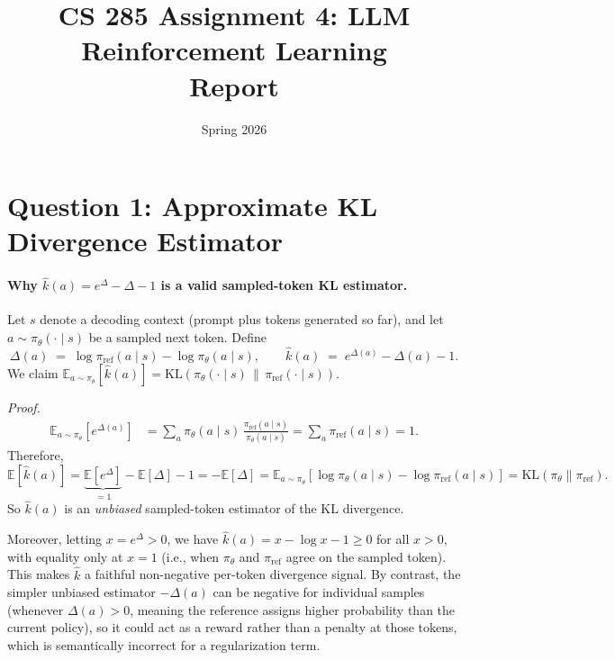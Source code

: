 \documentclass[11pt]{article}
\title{\textbf{CS 285 Assignment 4: LLM Reinforcement Learning}\\[0.4em]
       \large Report}
\author{}
\date{Spring 2026}
\begin{document}
\maketitle

\section*{Question 1: Approximate KL Divergence Estimator}

\paragraph{Why $\hat{k}(a) = e^{\Delta} - \Delta - 1$ is a valid sampled-token KL estimator.}

Let $s$ denote a decoding context (prompt plus tokens generated so far), and let
$a \sim \pi_\theta(\cdot \mid s)$ be a sampled next token. Define
\[
  \Delta(a) \;=\; \log \pi_{\mathrm{ref}}(a \mid s) - \log \pi_\theta(a \mid s),
  \qquad
  \hat{k}(a) \;=\; e^{\Delta(a)} - \Delta(a) - 1.
\]
We claim $\mathbb{E}_{a \sim \pi_\theta}[\hat{k}(a)]
= \mathrm{KL}\!\left(\pi_\theta(\cdot\mid s) \,\|\, \pi_{\mathrm{ref}}(\cdot\mid s)\right)$.

\textit{Proof.}
\begin{align*}
  \mathbb{E}_{a\sim\pi_\theta}\!\left[e^{\Delta(a)}\right]
    &= \sum_a \pi_\theta(a\mid s)\,\frac{\pi_{\mathrm{ref}}(a\mid s)}{\pi_\theta(a\mid s)}
     = \sum_a \pi_{\mathrm{ref}}(a\mid s) = 1.
\end{align*}
Therefore,
\[
  \mathbb{E}[\hat{k}(a)]
    = \underbrace{\mathbb{E}[e^{\Delta}]}_{=1} - \mathbb{E}[\Delta] - 1
    = -\mathbb{E}[\Delta]
    = \mathbb{E}_{a\sim\pi_\theta}\!\left[\log\pi_\theta(a\mid s) - \log\pi_{\mathrm{ref}}(a\mid s)\right]
    = \mathrm{KL}(\pi_\theta\|\pi_{\mathrm{ref}}).
\]
So $\hat{k}(a)$ is an \emph{unbiased} sampled-token estimator of the KL divergence.

Moreover, letting $x = e^{\Delta} > 0$, we have $\hat{k}(a) = x - \log x - 1 \geq 0$
for all $x > 0$, with equality only at $x = 1$ (i.e., when $\pi_\theta$ and $\pi_{\mathrm{ref}}$
agree on the sampled token). This makes $\hat{k}$ a faithful non-negative per-token divergence
signal. By contrast, the simpler unbiased estimator $-\Delta(a)$ can be negative for individual
samples (whenever $\Delta(a) > 0$, meaning the reference assigns higher probability than the
current policy), so it could act as a reward rather than a penalty at those tokens, which is
semantically incorrect for a regularization term.
\end{document}
